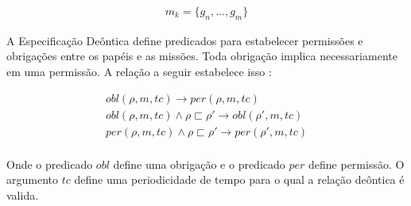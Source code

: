 \begin{eqnarray}
	m_k = \{ g_n,...,g_m\}
\end{eqnarray}


A Especificação Deôntica define predicados para estabelecer permissões e obrigações entre os papéis e as missões. Toda obrigação implica necessariamente em uma permissão. A relação a seguir estabelece isso \cite{moiseframework} \cite{deonticOne}: 

\begin{eqnarray}\nonumber \label{deonticRuleMoise}
	obl(\rho,m,tc) \to per(\rho,m,tc) \\
	obl(\rho,m,tc) \wedge \rho \sqsubset \rho' \to obl(\rho',m,tc) \\
	per(\rho,m,tc) \wedge \rho \sqsubset \rho' \to per(\rho',m,tc) \\	
\end{eqnarray}

Onde o predicado $obl$ define uma obrigação e o predicado $per$ define permissão. O argumento $tc$ define uma periodicidade de tempo para o qual a relação deôntica é valida. 